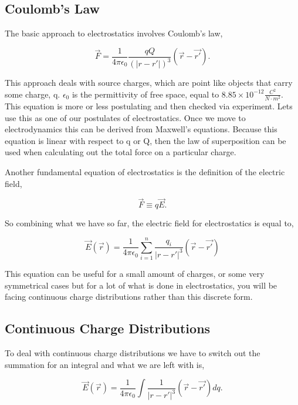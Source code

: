 \documentclass[preprint, review,12pt]{elsarticle}
\begin{document}
\subsection{Coulomb's Law}

The basic approach to electrostatics involves Coulomb's law,

\begin{equation}
    \vec{F} = \frac{1}{4\pi \epsilon_0}\frac{qQ}{(|r-r'|)^3}(\vec{r}-\vec{r'}).
\end{equation}

This approach deals with source charges, which are point like objects that carry some charge, q. $\epsilon_0$ is the permittivity of free space, equal to $8.85 \times 10^{-12} \frac{C^2}{N \cdot m^2}$. This equation is more or less postulating and then checked via experiment. Lets use this as one of our postulates of electrostatics. Once we move to electrodynamics this can be derived from Maxwell's equations. Because this equation is linear with respect to q or Q, then the law of superposition can be used when calculating out the total force on a particular charge.

Another fundamental equation of electrostatics is the definition of the electric field, 

\begin{equation}
    \vec{F} \equiv q\vec{E}.
\end{equation}

So combining what we have so far, the electric field for electrostatics is equal to,

\begin{equation}
    \vec{E}(\vec{r}) = \frac{1}{4 \pi \epsilon_0} \sum_{i=1}^n \frac{q_i}{|r-r'|^3} (\vec{r}-\vec{r'})
\end{equation}

This equation can be useful for a small amount of charges, or some very symmetrical cases but for a lot of what is done in electrostatics, you will be facing continuous charge distributions rather than this discrete form.


\subsection{Continuous Charge Distributions}

To deal with continuous charge distributions we have to switch out the summation for an integral and what we are left with is,

\begin{equation}
    \vec{E}(\vec{r}) = \frac{1}{4 \pi \epsilon_0} \int \frac{1}{|r-r'|^3}(\vec{r}-\vec{r'})dq.
\end{equation}
\end{document}

